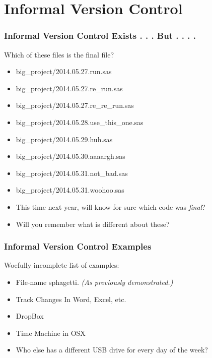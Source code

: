 \documentclass{beamer}
\begin{document}
\section{Informal Version Control} %

\begin{frame} %
  \frametitle{Informal Version Control Exists . . . But . . . .}
  {\large Which of these files is the final file?}
  \bigskip
  \begin{itemize}
  \item big\_project/2014.05.27.run.sas
  \item big\_project/2014.05.27.re\_run.sas
  \item big\_project/2014.05.27.re\_re\_run.sas
  \item big\_project/2014.05.28.use\_this\_one.sas
  \item big\_project/2014.05.29.huh.sas
  \item big\_project/2014.05.30.aaaargh.sas
  \item big\_project/2014.05.31.not\_bad.sas
  \item big\_project/2014.05.31.woohoo.sas
  \end{itemize}
  \pause
  \bigskip
  \begin{itemize}
  \item This time next year, will know for sure which code was
    \emph{final}?
  \item Will you remember what is different about these?
  \end{itemize}
  
\end{frame}

\begin{frame} %
  \frametitle{Informal Version Control Examples}
  {\large Woefully incomplete list of examples:}
  \bigskip
  \begin{itemize}
  \item File-name sphagetti. \emph{(As previously demonstrated.)}
  \item Track Changes In Word, Excel, etc.
  \item DropBox
  \item Time Machine in OSX
  \item Who else has a different USB drive for every day of the week?
  \end{itemize} 
\end{frame}
\end{document}
